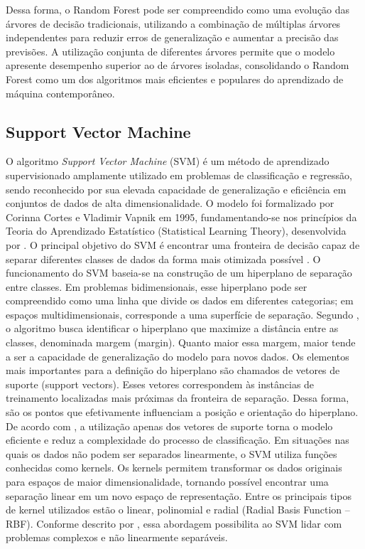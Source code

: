 \documentclass[
    12pt,                %
    openright,           %
    oneside,             %
    a4paper,             %
    english,             %
    brazil               %
]{abntex2}
\begin{document}
Dessa forma, o Random Forest pode ser compreendido como uma evolução das árvores de decisão tradicionais, utilizando a combinação de múltiplas árvores independentes para reduzir erros de generalização e aumentar a precisão das previsões. A utilização conjunta de diferentes árvores permite que o modelo apresente desempenho superior ao de árvores isoladas, consolidando o Random Forest como um dos algoritmos mais eficientes e populares do aprendizado de máquina contemporâneo.

\subsection{Support Vector Machine}
O algoritmo \textit{Support Vector Machine} (SVM) é um método de aprendizado supervisionado amplamente utilizado em problemas de classificação e regressão, sendo reconhecido por sua elevada capacidade de generalização e eficiência em conjuntos de dados de alta dimensionalidade. O modelo foi formalizado por Corinna Cortes e Vladimir Vapnik em 1995, fundamentando-se nos princípios da Teoria do Aprendizado Estatístico (Statistical Learning Theory), desenvolvida por . O principal objetivo do SVM é encontrar uma fronteira de decisão capaz de separar diferentes classes de dados da forma mais otimizada possível \cite{Cortes1995}.
O funcionamento do SVM baseia-se na construção de um hiperplano de separação entre classes. Em problemas bidimensionais, esse hiperplano pode ser compreendido como uma linha que divide os dados em diferentes categorias; em espaços multidimensionais, corresponde a uma superfície de separação. Segundo , o algoritmo busca identificar o hiperplano que maximize a distância entre as classes, denominada margem (margin). Quanto maior essa margem, maior tende a ser a capacidade de generalização do modelo para novos dados.
Os elementos mais importantes para a definição do hiperplano são chamados de vetores de suporte (support vectors). Esses vetores correspondem às instâncias de treinamento localizadas mais próximas da fronteira de separação. Dessa forma, são os pontos que efetivamente influenciam a posição e orientação do hiperplano. De acordo com , a utilização apenas dos vetores de suporte torna o modelo eficiente e reduz a complexidade do processo de classificação.
Em situações nas quais os dados não podem ser separados linearmente, o SVM utiliza funções conhecidas como kernels. Os kernels permitem transformar os dados originais para espaços de maior dimensionalidade, tornando possível encontrar uma separação linear em um novo espaço de representação. Entre os principais tipos de kernel utilizados estão o linear, polinomial e radial (Radial Basis Function – RBF). Conforme descrito por , essa abordagem possibilita ao SVM lidar com problemas complexos e não linearmente separáveis.
\end{document}
